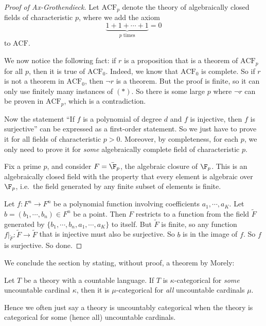 \documentclass[a4paper]{article}
\begin{document}
\begin{own}
\begin{proof}[Proof of Ax-Grothendieck]
    Let $\mathrm{ACF}_p$ denote the theory of algebraically closed fields of characteristic $p$, where we add the axiom
    \[
      \underbrace{1 + 1 + \cdots + 1}_{p\text{ times}} = 0
    \]
    to $\mathrm{ACF}$.

    We now notice the following fact: if $r$ is a proposition that is a theorem of $\mathrm{ACF}_p$ for all $p$, then it is true of $\mathrm{ACF}_0$. Indeed, we know that $\mathrm{ACF}_0$ is complete. So if $r$ is not a theorem in $\mathrm{ACF}_0$, then $\neg r$ is a theorem. But the proof is finite, so it can only use finitely many instances of $(*)$. So there is some large $p$ where $\neg r$ can be proven in $\mathrm{ACF}_p$, which is a contradiction.

    Now the statement ``If $f$ is a polynomial of degree $d$ and $f$ is injective, then $f$ is surjective'' can be expressed as a first-order statement. So we just have to prove it for all fields of characteristic $p > 0$. Moreover, by completeness, for each $p$, we only need to prove it for \emph{some} algebraically complete field of characteristic $p$.

    Fix a prime $p$, and consider $F = \bar{\F}_p$, the algebraic closure of $\F_p$. This is an algebraically closed field with the property that every element is algebraic over $\F_p$, i.e.\ the field generated by any finite subset of elements is finite.

    Let $f: F^n \to F^n$ be a polynomial function involving coefficients $a_1, \cdots, a_K$. Let $b = (b_1, \cdots, b_n) \in F^n$ be a point. Then $F$ restricts to a function from the field $\tilde{F}$ generated by $\{b_1, \cdots, b_n, a_1, \cdots, a_K\}$ to itself. But $\tilde{F}$ is finite, so any function $f|_{\tilde{F}}: \tilde{F} \to \tilde{F}$ that is injective must also be surjective. So $b$ is in the image of $f$. So $f$ is surjective. So done.
  \end{proof}

  We conclude the section by stating, without proof, a theorem by Morely:
  \begin{thm}
    Let $T$ be a theory with a countable language. If $T$ is $\kappa$-categorical for \emph{some} uncountable cardinal $\kappa$, then it is $\mu$-categorical for \emph{all} uncountable cardinals $\mu$.
  \end{thm}
  Hence we often just say a theory is uncountably categorical when the theory is categorical for some (hence all) uncountable cardinals.
\end{own}
\end{document}
